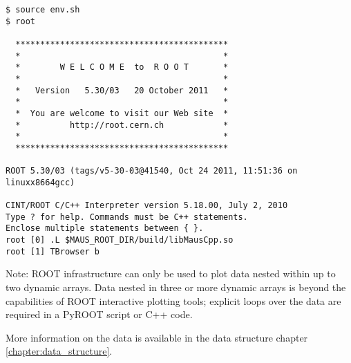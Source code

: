 \begin{verbatim}
$ source env.sh
$ root

  *******************************************
  *                                         *
  *        W E L C O M E  to  R O O T       *
  *                                         *
  *   Version   5.30/03   20 October 2011   *
  *                                         *
  *  You are welcome to visit our Web site  *
  *          http://root.cern.ch            *
  *                                         *
  *******************************************

ROOT 5.30/03 (tags/v5-30-03@41540, Oct 24 2011, 11:51:36 on linuxx8664gcc)

CINT/ROOT C/C++ Interpreter version 5.18.00, July 2, 2010
Type ? for help. Commands must be C++ statements.
Enclose multiple statements between { }.
root [0] .L $MAUS_ROOT_DIR/build/libMausCpp.so
root [1] TBrowser b
\end{verbatim}

Note: ROOT infrastructure can only be used to plot data nested within up to two dynamic arrays. Data nested in three or more dynamic arrays is beyond the capabilities of ROOT interactive plotting tools; explicit loops over the data are required in a PyROOT script or C++ code.

More information on the data is available in the data structure chapter \ref{chapter:data_structure}.

